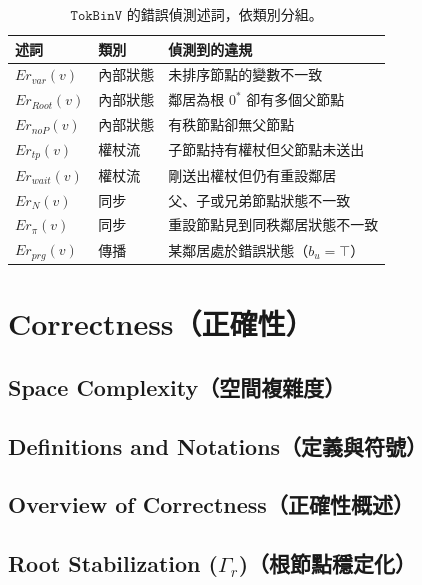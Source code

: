 \documentclass[a4paper, 12pt]{article}
\begin{document}
\begin{table}[h]
\centering
\renewcommand{\arraystretch}{1.4}
\begin{tabular}{l l l}
\hline
\textbf{述詞} & \textbf{類別} & \textbf{偵測到的違規} \\
\hline
\(Er_{var}(v)\)  & 內部狀態 & 未排序節點的變數不一致 \\
\(Er_{Root}(v)\) & 內部狀態 & 鄰居為根 \(0^*\) 卻有多個父節點 \\
\(Er_{noP}(v)\)  & 內部狀態 & 有秩節點卻無父節點 \\
\hline
\(Er_{tp}(v)\)   & 權杖流   & 子節點持有權杖但父節點未送出 \\
\(Er_{wait}(v)\) & 權杖流   & 剛送出權杖但仍有重設鄰居 \\
\hline
\(Er_N(v)\)      & 同步     & 父、子或兄弟節點狀態不一致 \\
\(Er_\pi(v)\)    & 同步     & 重設節點見到同秩鄰居狀態不一致 \\
\hline
\(Er_{prg}(v)\)  & 傳播     & 某鄰居處於錯誤狀態（\(b_u=\top\)） \\
\hline
\end{tabular}
\caption{\(\mathtt{TokBinV}\) 的錯誤偵測述詞，依類別分組。}
\label{tab:errors-zh}
\end{table}

\section{Correctness（正確性）}

\subsection{Space Complexity（空間複雜度）}

\subsection{Definitions and Notations（定義與符號）}

\subsection{Overview of Correctness（正確性概述）}

\subsection{Root Stabilization ($\Gamma_r$)（根節點穩定化）}
\label{sec:root}
\end{document}
